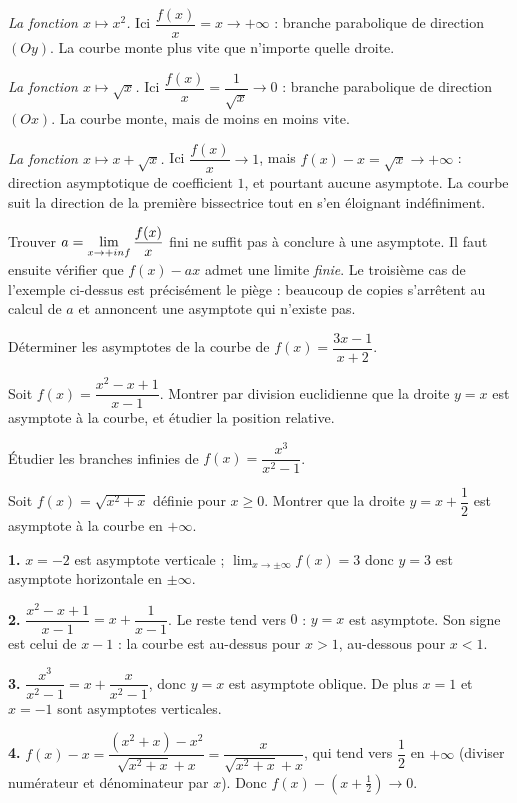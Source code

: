 \begin{exemple}
\emph{La fonction $x \mapsto x^{2}$.} Ici $\dfrac{f(x)}{x} = x \to +\infty$ :
branche parabolique de direction $(Oy)$. La courbe monte plus vite que
n'importe quelle droite.

\smallskip
\emph{La fonction $x \mapsto \sqrt{x}$.} Ici
$\dfrac{f(x)}{x} = \dfrac{1}{\sqrt{x}} \to 0$ : branche parabolique de
direction $(Ox)$. La courbe monte, mais de moins en moins vite.

\smallskip
\emph{La fonction $x \mapsto x + \sqrt{x}$.} Ici $\dfrac{f(x)}{x} \to 1$, mais
$f(x)-x = \sqrt{x} \to +\infty$ : direction asymptotique de coefficient $1$,
et pourtant aucune asymptote. La courbe suit la direction de la première
bissectrice tout en s'en éloignant indéfiniment.
\end{exemple}

\begin{erreurclassique}
Trouver $a = \limpinf \dfrac{f(x)}{x}$ fini ne suffit pas à conclure à une
asymptote. Il faut ensuite vérifier que $f(x)-ax$ admet une limite
\emph{finie}. Le troisième cas de l'exemple ci-dessus est précisément le
piège : beaucoup de copies s'arrêtent au calcul de $a$ et annoncent une
asymptote qui n'existe pas.
\end{erreurclassique}

\begin{entrainement}
\exo[\niveau{1}] Déterminer les asymptotes de la courbe de
$f(x) = \dfrac{3x-1}{x+2}$.

\exo[\niveau{2}] Soit $f(x) = \dfrac{x^{2}-x+1}{x-1}$. Montrer par division
euclidienne que la droite $y = x$ est asymptote à la courbe, et étudier la
position relative.

\exo[\niveau{2}] Étudier les branches infinies de $f(x) = \dfrac{x^{3}}{x^{2}-1}$.

\exo[\niveau{3}] Soit $f(x) = \sqrt{x^{2}+x}$ définie pour $x \geq 0$. Montrer
que la droite $y = x+\dfrac{1}{2}$ est asymptote à la courbe en $+\infty$.
\end{entrainement}

\begin{corrige}
\textbf{1.} $x = -2$ est asymptote verticale ; $\lim_{x \to \pm\infty} f(x) = 3$ donc $y = 3$ est
asymptote horizontale en $\pm\infty$.

\textbf{2.} $\dfrac{x^{2}-x+1}{x-1} = x + \dfrac{1}{x-1}$. Le reste tend vers
$0$ : $y = x$ est asymptote. Son signe est celui de $x-1$ : la courbe est
au-dessus pour $x>1$, au-dessous pour $x<1$.

\textbf{3.} $\dfrac{x^{3}}{x^{2}-1} = x + \dfrac{x}{x^{2}-1}$, donc $y=x$ est
asymptote oblique. De plus $x = 1$ et $x = -1$ sont asymptotes verticales.

\textbf{4.} $f(x)-x = \dfrac{(x^{2}+x)-x^{2}}{\sqrt{x^{2}+x}+x}
= \dfrac{x}{\sqrt{x^{2}+x}+x}$, qui tend vers $\dfrac{1}{2}$ en $+\infty$
(diviser numérateur et dénominateur par $x$). Donc $f(x)-\left(x+\tfrac12\right) \to 0$.
\end{corrige}

